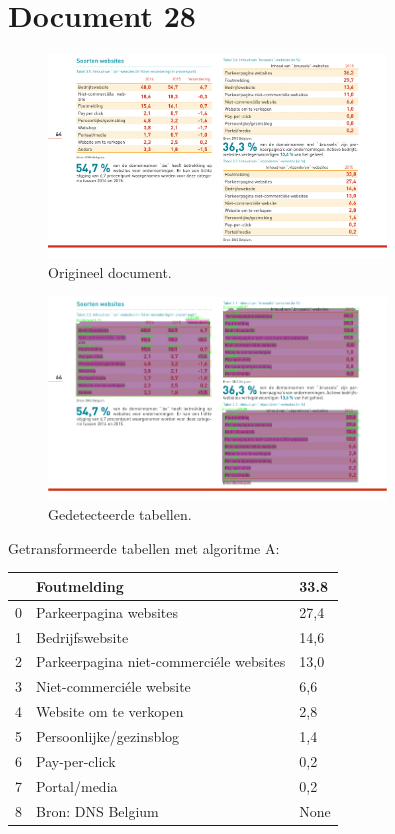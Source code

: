 \section{Document 28}

\begin{figure}[H]
    \centering
    \includegraphics[width=0.8\textwidth]{test-resultaten/28/original.png}
    \caption{Origineel document.}
\end{figure}

\begin{figure}[H]
    \centering
    \includegraphics[width=0.8\textwidth]{test-resultaten/28/detected_tables.png}
    \caption{Gedetecteerde tabellen.}
\end{figure}

Getransformeerde tabellen met algoritme A:

\begin{tabular}{lll}
\toprule
{} &                              Foutmelding &  33.8 \\
\midrule
0 &                   Parkeerpagina websites &  27,4 \\
1 &                          Bedrijfswebsite &  14,6 \\
2 &  Parkeerpagina niet-commerciéle websites &  13,0 \\
3 &                 Niet-commerciéle website &   6,6 \\
4 &                   Website om te verkopen &   2,8 \\
5 &                  Persoonlijke/gezinsblog &   1,4 \\
6 &                            Pay-per-click &   0,2 \\
7 &                             Portal/media &   0,2 \\
8 &                        Bron: DNS Belgium &  None \\
\bottomrule
\end{tabular}

